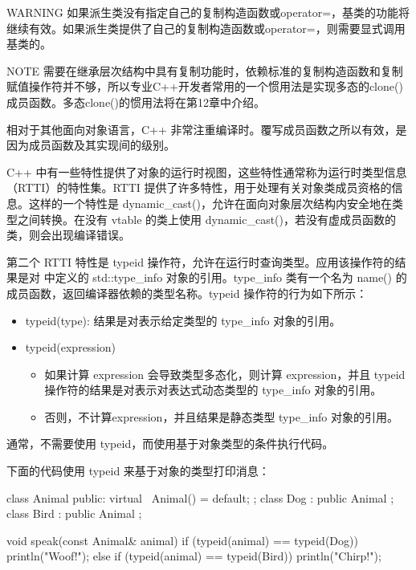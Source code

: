 \begin{myWarning}{WARNING}
如果派生类没有指定自己的复制构造函数或operator=，基类的功能将继续有效。如果派生类提供了自己的复制构造函数或operator=，则需要显式调用基类的。
\end{myWarning}

\begin{myNotic}{NOTE}
需要在继承层次结构中具有复制功能时，依赖标准的复制构造函数和复制赋值操作符并不够，所以专业C++开发者常用的一个惯用法是实现多态的clone()成员函数。多态clone()的惯用法将在第12章中介绍。
\end{myNotic}


相对于其他面向对象语言，C++ 非常注重编译时。覆写成员函数之所以有效，是因为成员函数及其实现间的级别。

C++ 中有一些特性提供了对象的运行时视图，这些特性通常称为运行时类型信息（RTTI）的特性集。RTTI 提供了许多特性，用于处理有关对象类成员资格的信息。这样的一个特性是 dynamic\_cast()，允许在面向对象层次结构内安全地在类型之间转换。在没有 vtable 的类上使用 dynamic\_cast()，若没有虚成员函数的类，则会出现编译错误。

第二个 RTTI 特性是 typeid 操作符，允许在运行时查询类型。应用该操作符的结果是对 中定义的 std::type\_info 对象的引用。type\_info 类有一个名为 name() 的成员函数，返回编译器依赖的类型名称。typeid 操作符的行为如下所示：

\begin{itemize}
\item
typeid(type): 结果是对表示给定类型的 type\_info 对象的引用。

\item
typeid(expression)
\begin{itemize}
\item
如果计算 expression 会导致类型多态化，则计算 expression，并且 typeid 操作符的结果是对表示对表达式动态类型的 type\_info 对象的引用。

\item
否则，不计算expression，并且结果是静态类型 type\_info 对象的引用。
\end{itemize}
\end{itemize}

通常，不需要使用 typeid，而使用基于对象类型的条件执行代码。

下面的代码使用 typeid 来基于对象的类型打印消息：

\begin{cpp}
class Animal { public: virtual ~Animal() = default; };
class Dog : public Animal {};
class Bird : public Animal {};

void speak(const Animal& animal)
{
    if (typeid(animal) == typeid(Dog)) {
        println("Woof!");
    } else if (typeid(animal) == typeid(Bird)) {
        println("Chirp!");
    }
}
\end{cpp}

